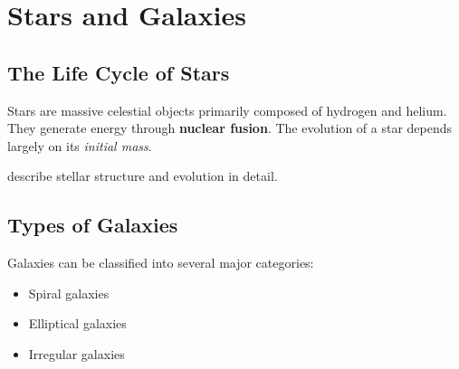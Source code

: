 \section{Stars and Galaxies}
\subsection{The Life Cycle of Stars}
Stars are massive celestial objects primarily composed of hydrogen and helium. They generate energy through \textbf{nuclear fusion}. The evolution of a star depends largely on its \textit{initial mass}.

\textcite{carroll2007} describe stellar structure and evolution in detail.

\subsection{Types of Galaxies}
Galaxies can be classified into several major categories:
\begin{itemize}
    \item Spiral galaxies
    \item Elliptical galaxies
    \item Irregular galaxies

\end{itemize}